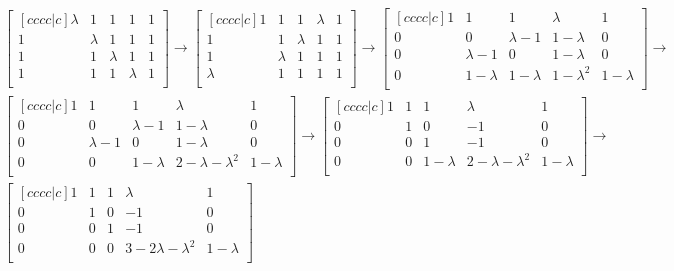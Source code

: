 \documentclass{article}
\begin{document}
\begin{enumerate}
\begin{align*}
&\begin{bmatrix}[cccc|c]
\lambda & 1 & 1 & 1 & 1\\
1 & \lambda & 1 & 1 & 1\\
1 & 1 & \lambda & 1 & 1\\
1 & 1 & 1 & \lambda & 1\\
\end{bmatrix}
\to
\begin{bmatrix}[cccc|c]
1 & 1 & 1 & \lambda & 1\\
1 & 1 & \lambda & 1 & 1\\
1 & \lambda & 1 & 1 & 1\\
\lambda & 1 & 1 & 1 & 1\\
\end{bmatrix}
\to
\begin{bmatrix}[cccc|c]
1 & 1 & 1 & \lambda & 1\\
0 & 0 & \lambda - 1 & 1 - \lambda & 0\\
0 & \lambda - 1 & 0 & 1 -\lambda  & 0\\
0 & 1 - \lambda & 1 - \lambda & 1 -\lambda^2 & 1-\lambda\\
\end{bmatrix}
\to\\
&\begin{bmatrix}[cccc|c]
1 & 1 & 1 & \lambda & 1\\
0 & 0 & \lambda - 1 & 1 - \lambda & 0\\
0 & \lambda - 1 & 0 & 1 -\lambda  & 0\\
0 & 0 & 1 - \lambda & 2 - \lambda - \lambda^2 & 1-\lambda\\
\end{bmatrix}
\to
\begin{bmatrix}[cccc|c]
1 & 1 & 1 & \lambda & 1\\
0 & 1 & 0 & -1 & 0\\
0 & 0 & 1 & -1 & 0\\
0 & 0 & 1 - \lambda & 2 - \lambda - \lambda^2 & 1-\lambda\\
\end{bmatrix}
\to\\
&\begin{bmatrix}[cccc|c]
1 & 1 & 1 & \lambda & 1\\
0 & 1 & 0 & -1 & 0\\
0 & 0 & 1 & -1 & 0\\
0 & 0 & 0 & 3 - 2\lambda - \lambda^2 & 1-\lambda\\
\end{bmatrix}\\

\end{align*}
\end{enumerate}
\end{document}
